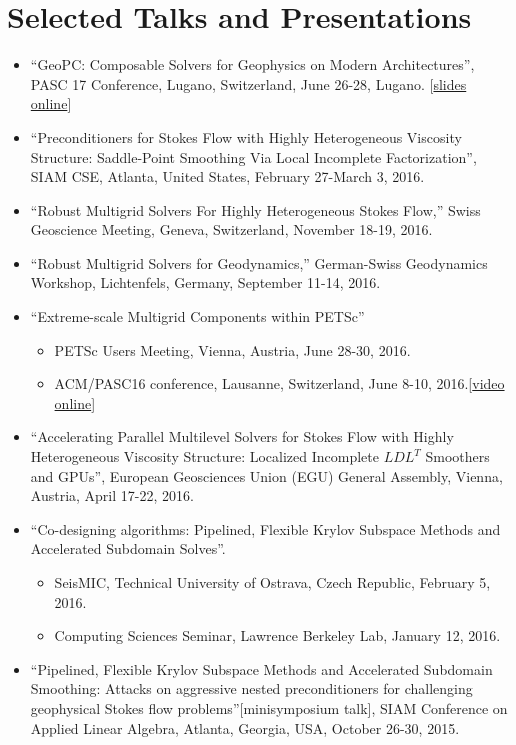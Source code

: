 \documentclass[12pt]{article}
\begin{document}
\section*{Selected Talks and Presentations}
\begin{itemize}
  \item ``GeoPC: Composable Solvers for Geophysics on Modern Architectures'', PASC 17 Conference, Lugano, Switzerland, June 26-28, Lugano. [\href{http://patricksanan.com/talks/SANAN_patrick_PASC17.pdf}{slides online}]
  \item ``Preconditioners for Stokes Flow with Highly Heterogeneous Viscosity Structure: Saddle-Point Smoothing Via Local Incomplete Factorization'', SIAM CSE, Atlanta, United States, February 27-March 3, 2016.
    \item ``Robust Multigrid Solvers For Highly Heterogeneous Stokes Flow,'' Swiss Geoscience Meeting, Geneva, Switzerland, November 18-19, 2016.
\item ``Robust Multigrid Solvers for Geodynamics,'' German-Swiss Geodynamics Workshop, Lichtenfels, Germany, September 11-14, 2016.
  \item ``Extreme-scale Multigrid Components within PETSc''
  \begin{itemize}
    \item PETSc Users Meeting, Vienna, Austria, June 28-30, 2016.
    \item ACM/PASC16 conference, Lausanne, Switzerland, June 8-10, 2016.[\href{http://insidehpc.com/2016/06/extreme-scale-multigrid/}{video online}]
  \end{itemize}
  \item ``Accelerating Parallel Multilevel Solvers for Stokes Flow with Highly Heterogeneous Viscosity Structure: Localized Incomplete $LDL^T$ Smoothers and GPUs'', European Geosciences Union (EGU) General Assembly, Vienna, Austria, April 17-22, 2016.
  \item ``Co-designing algorithms: Pipelined, Flexible Krylov Subspace Methods and  Accelerated Subdomain Solves''.
  \begin{itemize}
      \item SeisMIC, Technical University of Ostrava, Czech Republic, February 5, 2016.
      \item Computing Sciences Seminar, Lawrence Berkeley Lab, January 12, 2016.
  \end{itemize}
  \item ``Pipelined, Flexible Krylov Subspace Methods and Accelerated Subdomain Smoothing: Attacks on aggressive nested preconditioners for challenging geophysical Stokes flow problems''[minisymposium talk], SIAM Conference on Applied Linear Algebra, Atlanta, Georgia, USA, October 26-30, 2015.

\end{itemize}
\end{document}
